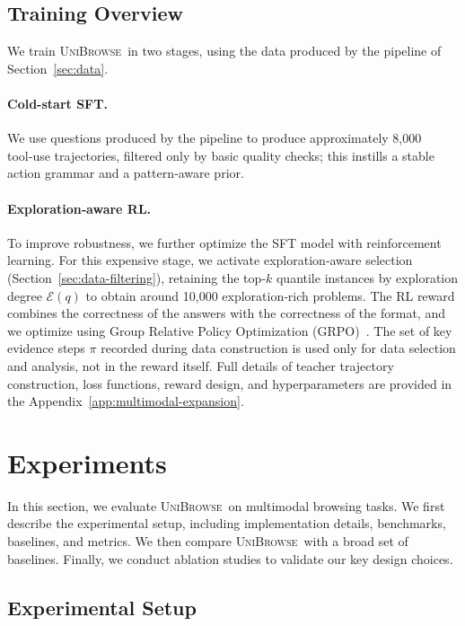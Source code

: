 \documentclass[11pt]{article}
\newcommand{\modelname}{\textsc{UniBrowse}}
\begin{document}
\subsection{Training Overview}
\label{sec:training_overview}

We train \modelname\ in two stages, using the data produced by the pipeline of Section~\ref{sec:data}.
\paragraph{Cold-start SFT.} We use questions produced by the pipeline to produce approximately 8,000 tool‑use trajectories, filtered only by basic quality checks; this instills a stable action grammar and a pattern‑aware prior.
\paragraph{Exploration‑aware RL.} To improve robustness, we further optimize the SFT model with reinforcement learning. For this expensive stage, we activate exploration‑aware selection (Section~\ref{sec:data-filtering}), retaining the top‑$k$ quantile instances by exploration degree $\mathcal{E}(q)$ to obtain around 10,000 exploration‑rich problems. The RL reward combines the correctness of the answers with the correctness of the format, and we optimize using Group Relative Policy Optimization (GRPO)~\citep{shao2024deepseekmath}. The set of key evidence steps $\pi$ recorded during data construction is used only for data selection and analysis, not in the reward itself.
Full details of teacher trajectory construction, loss functions, reward design, and hyperparameters are provided in the Appendix~\ref{app:multimodal-expansion}.

\section{Experiments}

In this section, we evaluate \modelname\ on multimodal browsing tasks. We first describe the experimental setup, including implementation details, benchmarks, baselines, and metrics. We then compare \modelname\ with a broad set of baselines. Finally, we conduct ablation studies to validate our key design choices.



\subsection{Experimental Setup}
\end{document}
